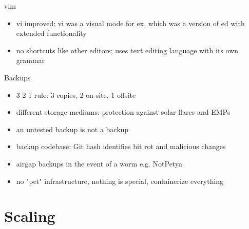 \documentclass{beamer}
\begin{document}
\begin{frame}{vim}
  \begin{itemize}
    \item vi improved; vi was a visual mode for ex, which was a version of ed
      with extended functionality
    \item no shortcuts like other editors; uses text editing language with its
      own grammar
  \end{itemize}
\end{frame}

\begin{frame}{Backups}
  \begin{itemize}
    \item 3 2 1 rule: 3 copies, 2 on-site, 1 offsite
    \item different storage mediums: protection against solar flares and EMPs
    \item an untested backup is not a backup
    \item backup codebase: Git hash identifies bit rot and malicious
      changes
    \item airgap backups in the event of a worm e.g. NotPetya
    \item no "pet" infrastructure, nothing is special, containerize everything
  \end{itemize}
\end{frame}

\section{Scaling}
\end{document}
